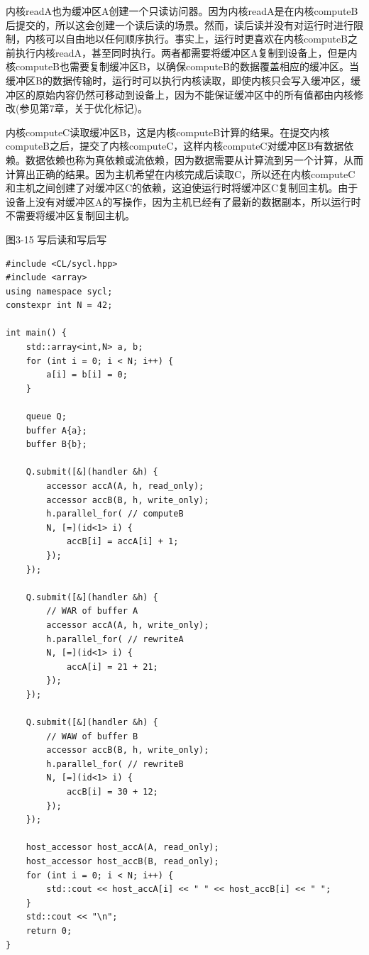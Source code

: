 内核readA也为缓冲区A创建一个只读访问器。因为内核readA是在内核computeB后提交的，所以这会创建一个读后读的场景。然而，读后读并没有对运行时进行限制，内核可以自由地以任何顺序执行。事实上，运行时更喜欢在内核computeB之前执行内核readA，甚至同时执行。两者都需要将缓冲区A复制到设备上，但是内核computeB也需要复制缓冲区B，以确保computeB的数据覆盖相应的缓冲区。当缓冲区B的数据传输时，运行时可以执行内核读取，即使内核只会写入缓冲区，缓冲区的原始内容仍然可移动到设备上，因为不能保证缓冲区中的所有值都由内核修改(参见第7章，关于优化标记)。\par

内核computeC读取缓冲区B，这是内核computeB计算的结果。在提交内核computeB之后，提交了内核computeC，这样内核computeC对缓冲区B有数据依赖。数据依赖也称为真依赖或流依赖，因为数据需要从计算流到另一个计算，从而计算出正确的结果。因为主机希望在内核完成后读取C，所以还在内核computeC和主机之间创建了对缓冲区C的依赖，这迫使运行时将缓冲区C复制回主机。由于设备上没有对缓冲区A的写操作，因为主机已经有了最新的数据副本，所以运行时不需要将缓冲区复制回主机。\par

\hspace*{\fill} \par %
图3-15 写后读和写后写
\begin{lstlisting}[caption={}]
#include <CL/sycl.hpp>
#include <array>
using namespace sycl;
constexpr int N = 42;

int main() {
	std::array<int,N> a, b;
	for (int i = 0; i < N; i++) {
		a[i] = b[i] = 0;
	}

	queue Q;
	buffer A{a};
	buffer B{b};
	
	Q.submit([&](handler &h) {
		accessor accA(A, h, read_only);
		accessor accB(B, h, write_only);
		h.parallel_for( // computeB
		N, [=](id<1> i) {
			accB[i] = accA[i] + 1;
		});
	});

	Q.submit([&](handler &h) {
		// WAR of buffer A
		accessor accA(A, h, write_only);
		h.parallel_for( // rewriteA
		N, [=](id<1> i) {
			accA[i] = 21 + 21;
		});
	});

	Q.submit([&](handler &h) {
		// WAW of buffer B
		accessor accB(B, h, write_only);
		h.parallel_for( // rewriteB
		N, [=](id<1> i) {
			accB[i] = 30 + 12;
		});
	});

	host_accessor host_accA(A, read_only);
	host_accessor host_accB(B, read_only);
	for (int i = 0; i < N; i++) {
		std::cout << host_accA[i] << " " << host_accB[i] << " ";
	}
	std::cout << "\n";
	return 0;
}
\end{lstlisting}

